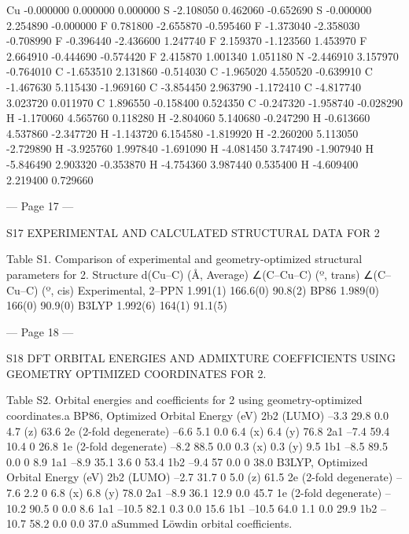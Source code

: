   Cu     -0.000000      0.000000      0.000000 
  S      -2.108050      0.462060     -0.652690 
  S      -0.000000      2.254890     -0.000000 
  F       0.781800     -2.655870     -0.595460 
  F      -1.373040     -2.358030     -0.708990 
  F      -0.396440     -2.436600      1.247740 
  F       2.159370     -1.123560      1.453970 
  F       2.664910     -0.444690     -0.574420 
  F       2.415870      1.001340      1.051180 
  N      -2.446910      3.157970     -0.764010 
  C      -1.653510      2.131860     -0.514030 
  C      -1.965020      4.550520     -0.639910 
  C      -1.467630      5.115430     -1.969160 
  C      -3.854450      2.963790     -1.172410 
  C      -4.817740      3.023720      0.011970 
  C       1.896550     -0.158400      0.524350 
  C      -0.247320     -1.958740     -0.028290 
  H      -1.170060      4.565760      0.118280 
  H      -2.804060      5.140680     -0.247290 
  H      -0.613660      4.537860     -2.347720 
  H      -1.143720      6.154580     -1.819920 
  H      -2.260200      5.113050     -2.729890 
  H      -3.925760      1.997840     -1.691090 
  H      -4.081450      3.747490     -1.907940 
  H      -5.846490      2.903320     -0.353870 
  H      -4.754360      3.987440      0.535400 
  H      -4.609400      2.219400      0.729660 
 
 
 
 
 
 
 
 
 


--- Page 17 ---
 
S17 
EXPERIMENTAL AND CALCULATED STRUCTURAL DATA 
FOR 2 
 
Table S1. Comparison of experimental and geometry-optimized structural parameters for 2. 
Structure 
d(Cu–C) (Å, Average) 
∠(C–Cu–C) (º, trans) 
∠(C–Cu–C) (º, cis) 
Experimental, 2–PPN 
1.991(1) 
166.6(0) 
90.8(2) 
BP86 
1.989(0) 
166(0) 
90.9(0) 
B3LYP 
1.992(6) 
164(1) 
91.1(5) 
 
 


--- Page 18 ---
 
S18 
DFT ORBITAL ENERGIES AND ADMIXTURE COEFFICIENTS 
USING GEOMETRY OPTIMIZED COORDINATES FOR 2. 
 
Table S2. Orbital energies and coefficients for 2 using geometry-optimized coordinates.a 
BP86, Optimized 
Orbital 
Energy 
(eV) 
2b2 (LUMO) 
–3.3 
29.8 
0.0 
4.7 (z) 
63.6 
2e 
(2-fold degenerate) 
–6.6 
5.1 
0.0 
6.4 (x) 
6.4 (y) 
76.8 
2a1 
–7.4 
59.4 
10.4 
0 
26.8 
1e 
(2-fold degenerate) 
–8.2 
88.5 
0.0 
0.3 (x) 
0.3 (y) 
9.5 
1b1 
–8.5 
89.5 
0.0 
0 
8.9 
1a1 
–8.9 
35.1 
3.6 
0 
53.4 
1b2 
–9.4 
57 
0.0 
0 
38.0 
B3LYP, Optimized 
Orbital 
Energy 
(eV) 
2b2 (LUMO) 
–2.7 
31.7 
0 
5.0 (z) 
61.5 
2e 
(2-fold degenerate) 
–7.6 
2.2 
0 
6.8 (x) 
6.8 (y) 
78.0 
2a1 
–8.9 
36.1 
12.9 
0.0 
45.7 
1e 
(2-fold degenerate) 
–10.2 
90.5 
0 
0.0 
8.6 
1a1 
–10.5 
82.1 
0.3 
0.0 
15.6 
1b1 
–10.5 
64.0 
1.1 
0.0 
29.9 
1b2 
–10.7 
58.2 
0.0 
0.0 
37.0 
aSummed Löwdin orbital coefficients. 
 

